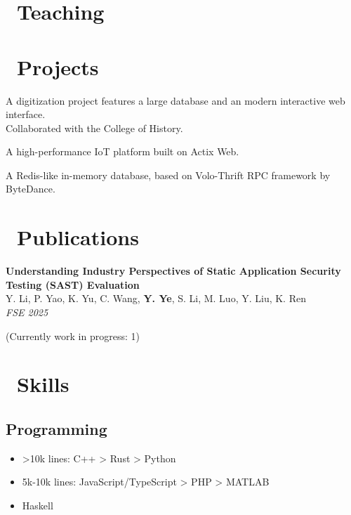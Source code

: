 \documentclass{resume}
\begin{document}
\section{\faBook\ Teaching}

\section{\faCode\ Projects}
A digitization project features a large database and an modern interactive web interface.\\
Collaborated with the College of History.

A high-performance IoT platform built on Actix Web.

A Redis-like in-memory database, based on Volo-Thrift RPC framework by ByteDance.

\section{\faBookmarkO\ Publications}

\textbf{Understanding Industry Perspectives of Static Application Security Testing (SAST) Evaluation} \\
Y. Li, P. Yao, K. Yu, C. Wang, \textbf{Y. Ye}, S. Li, M. Luo, Y. Liu, K. Ren \\
\textit{FSE 2025}

(Currently work in progress: 1)

\section{\faCogs\ Skills}
\subsection{\textbf{Programming}}
\begin{itemize}[itemsep=0.5ex]
  \item >10k lines: C++ > Rust > Python
  \item 5k-10k lines: JavaScript/TypeScript > PHP > MATLAB
  \item <5k lines: Java > Haskell
\end{itemize}
\end{document}
